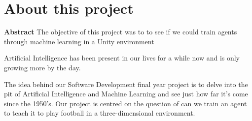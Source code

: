 
\chapter*{About this project}
\large\textbf{Abstract}
\newline
The objective of this project was to to see if we could train agents through machine learning in a Unity environment

Artificial Intelligence has been present in our lives for a while now and is only growing more by the day.

The idea behind our Software Development final year project is to delve into the pit of Artificial Intelligence and Machine Learning and see just how far it’s come since the 1950’s. Our project is centred on the question of can we train an agent to teach it to play football in a three-dimensional environment.

